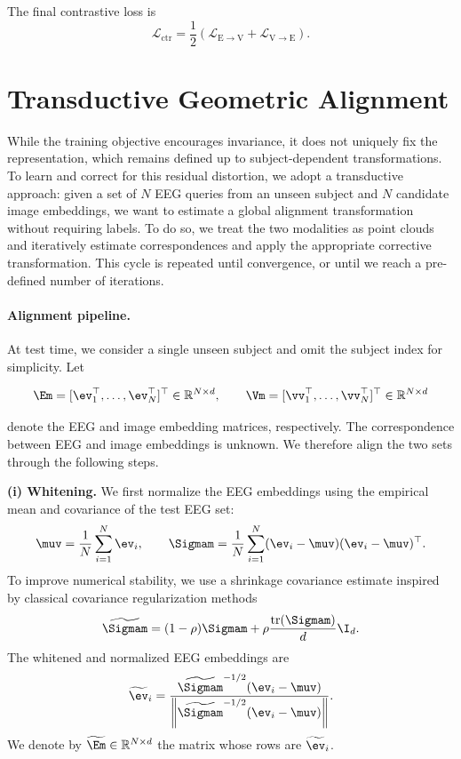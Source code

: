 \documentclass{article}
\begin{document}
The final contrastive loss is
\begin{equation}\label{eq:loss_fin}
\mathcal{L}_{\mathrm{ctr}} = \frac{1}{2} \left( \mathcal{L}_{\mathrm{E \to V}} + \mathcal{L}_{\mathrm{V \to E}} \right).
\end{equation}

\section{Transductive Geometric Alignment}
\label{sec:testing}

While the training objective encourages invariance, it does not uniquely fix the representation, which remains defined up to subject-dependent transformations. To learn and correct for this residual distortion, we adopt a transductive approach: given a set of $N$ EEG queries from an unseen subject and $N$ candidate image embeddings, we want to estimate a global alignment transformation without requiring labels.  To do so, we treat the two modalities as point clouds and iteratively estimate correspondences and apply the appropriate corrective transformation. This cycle is repeated until convergence, or until we reach a pre-defined number of iterations.

\paragraph{Alignment pipeline.}
At test time, we consider a single unseen subject and omit the subject index for simplicity. 
Let

$$\Em = [\ev_1^\top,\ldots,\ev_N^\top]^\top \in \mathbb{R}^{N\times d},
\qquad
\Vm = [\vv_1^\top,\ldots,\vv_N^\top]^\top \in \mathbb{R}^{N\times d}$$

denote the EEG and image embedding matrices, respectively. 
The correspondence between EEG and image embeddings is unknown. 
We therefore align the two sets through the following steps.


\textbf{(i) Whitening.}
We first normalize the EEG embeddings using the empirical mean and covariance of the test EEG set:
\begin{equation}
\muv = \frac{1}{N}\sum_{i=1}^{N} \ev_i,
\qquad
\Sigmam = \frac{1}{N}\sum_{i=1}^{N}(\ev_i-\muv)(\ev_i-\muv)^\top .
\end{equation}
To improve numerical stability, we use a shrinkage covariance estimate inspired by classical covariance regularization methods~\cite{ledoit2004honey}
\begin{equation}
\widetilde{\Sigmam}
=
(1-\rho)\Sigmam
+
\rho \frac{\operatorname{tr}(\Sigmam)}{d}\I_d .
\end{equation}
The whitened and normalized EEG embeddings are
\begin{equation}
\widetilde{\ev}_i
=
\frac{
\widetilde{\Sigmam}^{-1/2}(\ev_i-\muv)
}{
\left\|\widetilde{\Sigmam}^{-1/2}(\ev_i-\muv)\right\|
}.
\end{equation}
We denote by $\widetilde{\Em}\in \mathbb{R}^{N\times d}$ the matrix whose rows are $\widetilde{\ev}_i$.
\end{document}
